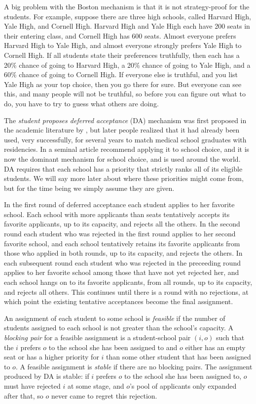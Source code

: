 \documentclass[12pt]{article}
\theoremstyle{definition}
\begin{document}
A big problem with the Boston mechanism is that it is not
strategy-proof for the students.  For example, suppose there are three
high schools, called Harvard High, Yale High, and Cornell High.
Harvard High and Yale High each have 200 seats in their entering
class, and Cornell High has 600 seats.  Almost everyone prefers
Harvard High to Yale High, and almost everyone strongly prefers Yale
High to Cornell High.  If all students state their preferences
truthfully, then each has a 20\% chance of going to Harvard High, a
20\% chance of going to Yale High, and a 60\% chance of going to
Cornell High.  If everyone else is truthful, and you list Yale High as
your top choice, then you go there for sure.  But everyone can see
this, and many people will not be truthful, so before you can figure
out what to do, you have to try to guess what others are doing.

The \emph{student proposes deferred acceptance} (DA) mechanism was
first proposed in the academic literature by \cite{GaSh62}, but later
people realized that it had already been used, very successfully, for
several years to match medical school graduates with residencies.  In
a seminal article \cite{as03aer} recommend applying it to school
choice, and it is now the dominant mechanism for school choice, and is
used around the world.  DA requires that each school has a priority
that strictly ranks all of its eligible students.  We will say more
later about where these priorities might come from, but for the time
being we simply assume they are given.

In the first round of deferred acceptance each student applies to her
favorite school.  Each school with more applicants than seats
tentatively accepts its favorite applicants, up to its capacity, and
rejects all the others.  In the second round each student who was
rejected in the first round applies to her second favorite school, and
each school tentatively retains its favorite applicants from those who
applied in both rounds, up to its capacity, and rejects the others.
In each subsequent round each student who was rejected in the
preceeding round applies to her favorite school among those that have
not yet rejected her, and each school hangs on to its favorite
applicants, from all rounds, up to its capacity, and rejects all
others.  This continues until there is a round with no rejections, at
which point the existing tentative acceptances become the final assignment.

An assignment of each student to some school is \emph{feasible} if the
number of students assigned to each school is not greater than the
school's capacity.  A \emph{blocking pair} for a feasible assignment
is a student-school pair $(i,o)$ such that the $i$ prefers $o$ to the
school she has been assigned to and $o$ either has an empty seat or
has a higher priority for $i$ than some other student that has been
assigned to $o$.  A feasible assignment is \emph{stable} if there are
no blocking pairs.  The assignment produced by DA is stable: if $i$ prefers
$o$ to the school she has been assigned to, $o$ must have rejected $i$
at some stage, and $o$'s pool of applicants only expanded after that,
so $o$ never came to regret this rejection.
\end{document}
